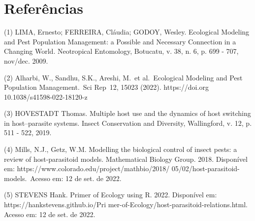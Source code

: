 \newpage

\section{Referências}

(1) LIMA, Ernesto; FERREIRA, Cláudia; GODOY, Wesley. Ecological Modeling and Pest Population Management: a Possible and 
Necessary Connection in a Changing World. Neotropical Entomology, Botucatu, v. 38, n. 6, p. 699 - 707, nov/dec. 2009.

\medskip

(2) Alharbi, W., Sandhu, S.K., Areshi, M. et al. Ecological Modeling and Pest Population Management. Sci Rep 12, 15023 (2022). https://doi.org 10.1038/s41598-022-18120-z

\medskip

(3) HOVESTADT Thomas. Multiple host use and the dynamics of host switching in host–parasite systems. Insect Conservation and Diversity, Wallingford, v. 12, p. 511 - 522, 2019.

\medskip

(4) Mills, N.J., Getz, W.M. Modelling the biological control of insect pests: a review of host-parasitoid models. Mathematical Biology Group. 2018. Disponível em: https://www.colorado.edu/project/mathbio/2018/
05/02/host-parasitoid-models. Acesso em: 12 de set. de 2022. 

\medskip

(5) STEVENS Hank. Primer of Ecology using R. 2022. Disponível em: https://hankstevens.github.io/Pri
mer-of-Ecology/host-parasitoid-relations.html. Acesso em: 12 de set. de 2022.


